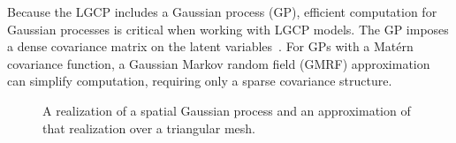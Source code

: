 \documentclass[]{interact}
\begin{document}
Because the LGCP includes a Gaussian process (GP), efficient computation for
Gaussian processes is critical when working with LGCP models. The GP imposes a
dense covariance matrix on the latent variables~\cite{rinla}. For GPs with a
Mat\'{e}rn covariance function, a Gaussian Markov random field (GMRF)
approximation can simplify computation, requiring only a sparse covariance
structure.

\begin{figure}[p]


\caption{A realization of a spatial Gaussian process and an
approximation of that realization over a triangular mesh.}
\label{surface}
\end{figure}
\end{document}
